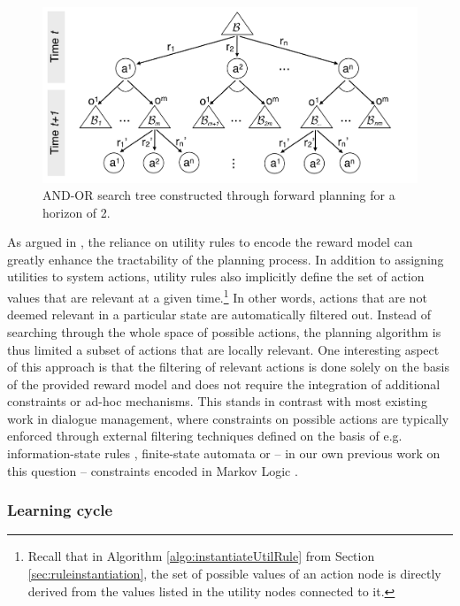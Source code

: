 \begin{figure}[h!]
\centering
\includegraphics[scale=0.30]{imgs/andortree.pdf}
\caption{AND-OR search tree constructed through forward planning for a horizon of 2.}
\label{fig:modelbasediagram}
\end{figure}

As argued in \cite{onlineplanning-iwsds2012}, the reliance on utility rules to encode the reward model can greatly enhance the tractability of the planning process.  In addition to assigning utilities to system actions, utility rules also implicitly define the set of action values that are relevant at a given time.\footnote{Recall that in Algorithm \ref{algo:instantiateUtilRule} from Section \ref{sec:ruleinstantiation}, the set of possible values of an action node is directly derived from the values listed in the utility nodes connected to it.} In other words, actions that are not deemed relevant in a particular state are automatically filtered out.  Instead of searching through the whole space of possible actions, the planning algorithm is thus limited a subset of actions that are locally relevant.  One interesting aspect of this approach is that the filtering of relevant actions is done solely on the basis of the provided reward model and does not require the integration of additional constraints or ad-hoc mechanisms. This stands in contrast with most existing work in dialogue management, where constraints on possible actions are typically enforced through external filtering techniques defined on the basis of e.g. information-state rules \citep{heeman2007}, finite-state automata \citep{williams2008} or -- in our own previous work on this question -- constraints encoded in Markov Logic \citep{srw-acl2010}. 

 
\subsubsection*{Learning cycle}

